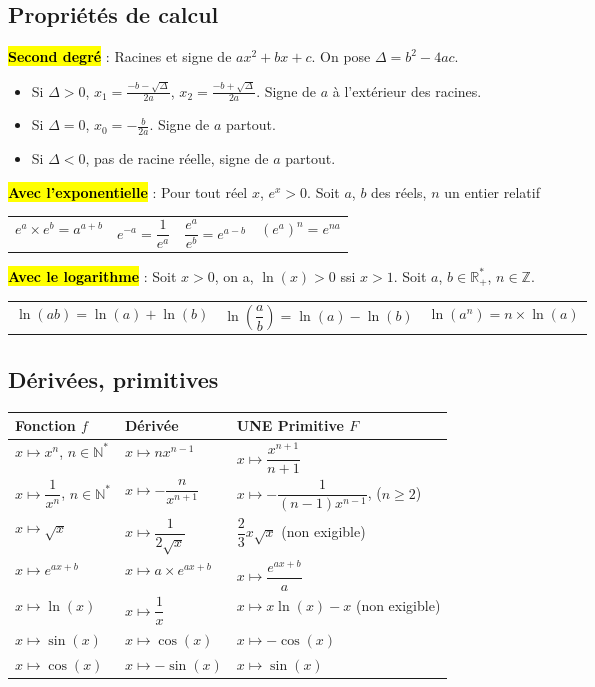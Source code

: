 \documentclass[10pt,fleqn, openany, landscape, twocolumn]{book} %
\begin{document}
\subsection*{Propriétés de calcul}

\hl{\textbf{Second degré}} : Racines et signe de $ax^2+bx+c$. On pose $\Delta=b^2-4ac$.
\begin{itemize}
\item Si $\Delta >0$, $x_1=\frac{-b-\sqrt{\Delta}}{2a}$, $x_2=\frac{-b+\sqrt{\Delta}}{2a}$. Signe de $a$ à l'extérieur des racines.
\item Si $\Delta=0$, $x_0=-\frac{b}{2a}$. Signe de $a$ partout.
\item Si $\Delta<0$, pas de racine réelle, signe de $a$ partout.
\end{itemize}

\hl{\textbf{Avec l'exponentielle}} : Pour tout réel $x$, $e^x>0$. Soit $a$, $b$ des réels, $n$ un entier relatif

\begin{tabularx}{\linewidth}{XXXX}
$e^a\times e^b = a^{a+b}$ & $e^{-a}=\dfrac{1}{e^a}$ & $\dfrac{e^a}{e^b}=e^{a-b}$ & $(e^a)^n=e^{na}$
\end{tabularx}

\hl{\textbf{Avec le logarithme}} : Soit $x>0$, on a, $\ln(x)>0$ ssi $x>1$. Soit $a$, $b \in \mathbb{R}_+^*$, $n\in\mathbb{Z}$.

\begin{tabularx}{\linewidth}{XXX}
$\ln(ab)=\ln(a)+\ln(b)$ & $\ln\left(\dfrac{a}{b}\right)=\ln(a)-\ln(b)$ & $\ln(a^n)=n \times \ln(a)$
\end{tabularx}

\subsection*{Dérivées, primitives}
\renewcommand{\arraystretch}{2.2}
\begin{tabularx}{\linewidth}{|X|X|X|}

\hline
Fonction $f$ & Dérivée & \textbf{UNE} Primitive $F$  \\
\hline
$x \mapsto x^n$, $n\in \mathbb{N}^*$ & $x\mapsto nx^{n-1}$ & $x\mapsto \dfrac{x^{n+1}}{n+1}$   \\
\hline
$x \mapsto \dfrac{1}{x^n}$, $n\in \mathbb{N}^*$ & $x\mapsto -\dfrac{n}{x^{n+1}}$ & $x\mapsto -\dfrac{1}{(n-1)x^{n-1}}$, ($n \geqslant 2$) \\
\hline
$x\mapsto \sqrt{x}$ & $x \mapsto\dfrac{1}{2\sqrt{x}}$ & $\dfrac{2}{3}x\sqrt{x}$ (non exigible)  \\
\hline
$x \mapsto e^{ax+b}$ & $x\mapsto a \times e^{ax+b}$ & $x\mapsto \dfrac{e^{ax+b}}{a}$ \\
\hline
$x \mapsto \ln(x)$ & $x\mapsto \dfrac{1}{x}$ &  $x\mapsto x\ln(x)-x$ (non exigible)  \\
\hline
$x \mapsto \sin(x)$ & $x\mapsto \cos(x)$ &  $x\mapsto -\cos(x)$   \\
\hline
$x \mapsto \cos(x)$ & $x\mapsto -\sin(x)$ &  $x\mapsto \sin(x)$   \\
\hline
\end{tabularx}
\end{document}

